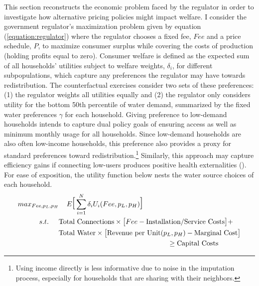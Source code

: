 \documentclass[12pt]{article}
\begin{document}
This section reconstructs the economic problem faced by the regulator in order to investigate how alternative pricing policies might impact welfare.  I consider the government regulator's maximization problem given by equation (\ref{equation:regulator}) where the regulator chooses a fixed fee, $Fee$ and a price schedule, $P$, to maximize consumer surplus while covering the costs of production (holding profits equal to zero).  Consumer welfare is defined as the expected sum of all households' utilities subject to welfare weights, $\delta_i$, for different subpopulations, which capture any preferences the regulator may have towards redistribution.  The counterfactual exercises consider two sets of these preferences: (1) the regulator weights all utilities equally and (2) the regulator only considers utility for the bottom 50th percentile of water demand, summarized by the fixed water preferences $\gamma$ for each household.  Giving preference to low-demand households intends to capture dual policy goals of ensuring access as well as minimum monthly usage for all households.  Since low-demand households are also often low-income households, this preference also provides a proxy for standard preferences toward redistribution.\footnote{Using income directly is less informative due to noise in the imputation process, especially for households that are sharing with their neighbors.}  Similarly, this approach may capture efficiency gains if connecting low-users produces positive health externalities (\cite{galiani2005water,gamper2010impact}).  For ease of exposition, the utility function below nests the water source choices of each household.
\begin{align}
\begin{split}
max_{Fee,p_{L},p_{H}} &\hspace{.4cm} E\text{\LARGE [} \sum_{i=1}^{N} \delta_i U_{i}(Fee,p_{L},p_{H}) \text{\LARGE ]} \\
s.t. \hspace{.5cm} & \text{Total Connections} \times \big[ Fee - \text{Installation/Service Costs} \big] + \\
              & \text{Total Water} \times \big[ \text{Revenue per Unit}(p_{L},p_{H})  - \text{Marginal Cost}  \big] \\
      & \hspace{5.5cm} \geq \text{Capital Costs}
\end{split}
\label{equation:regulator}
\end{align}
\end{document}
